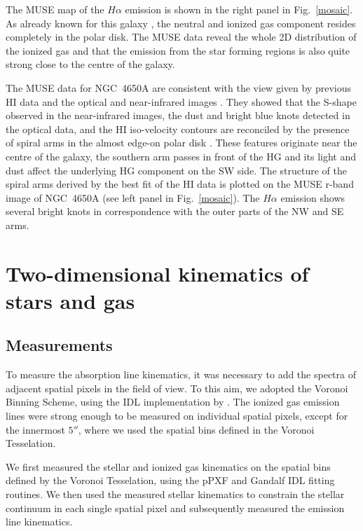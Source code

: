 \documentclass{aa}
\begin{document}
  The MUSE map of the $H{\alpha}$ emission is shown in the right
  panel in Fig.~\ref{mosaic}. As already known for this galaxy
  \citep{Arn97,Swaters2003}, the neutral and ionized gas component
  resides completely in the polar disk. The MUSE data reveal the whole
  2D distribution of the ionized gas and that the emission from the
  star forming regions is also quite strong  close to the centre of the galaxy.

  The MUSE data for NGC~4650A are consistent with the view given by
  previous H{\small I} data \citep{Arn97} and the optical and
  near-infrared images \citep{Iodice02,Gal02}.  They showed that the
  S-shape observed in the near-infrared images, the dust and
  bright blue knots detected in the optical data, and the H{\small I}
  iso-velocity contours are reconciled by the presence of spiral arms in
  the almost edge-on polar disk \citep{Arn97}. These features
  originate near the centre of the galaxy, the southern  arm passes in
  front of the HG and its light and dust affect the underlying HG
  component on the SW side. The structure of the spiral arms derived
  by the best fit of the H{\small I} data is plotted on the MUSE
  r-band image of NGC~4650A (see left panel in Fig.~\ref{mosaic}). The
  $H{\alpha}$ emission shows several bright knots in correspondence with
  the outer parts of the NW and SE arms.





\section{Two-dimensional kinematics of stars and gas}\label{kin}


\subsection{Measurements}

To measure the absorption line kinematics, it was necessary to
add the spectra of adjacent spatial pixels in the field of view. To
this aim, we adopted the Voronoi Binning Scheme, using the IDL
implementation by \citet{Cappellari+03}.  The ionized gas emission
lines were strong enough to be measured on individual spatial pixels,
except for the innermost $5''$, where we used the spatial bins defined
in the Voronoi Tesselation.

We first measured the stellar and ionized gas kinematics on the
spatial bins defined by the Voronoi Tesselation, using the pPXF
\citep{Cappellari2004} and Gandalf \citep{Sarzi2006} IDL
fitting routines. We then used the measured stellar kinematics to
constrain the stellar continuum in each single spatial pixel and subsequently measured
the emission line kinematics.
\end{document}

